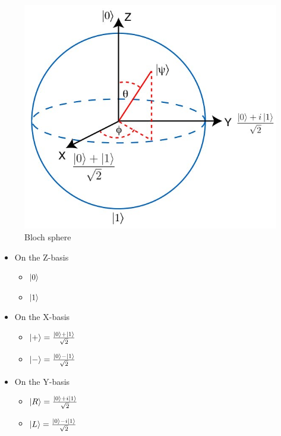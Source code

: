 \begin{figure} [h]
    \centering
    \includegraphics[width=\textwidth]{img/bloch.jpg}
        \caption{Bloch sphere \autocite{imgbloch}}
        \label{fig:bloch sphere}
\end{figure}

\begin{itemize}
    \item On the Z-basis
        \begin{itemize}
            \item $\ket{0}$
            \item $\ket{1}$
        \end{itemize}
    \item On the X-basis
        \begin{itemize}
            \item $\ket{+} = \frac{\ket{0} + \ket{1}}{\sqrt{2}}$
            \item $\ket{-} = \frac{\ket{0} - \ket{1}}{\sqrt{2}}$
        \end{itemize}
    \item On the Y-basis
        \begin{itemize}
            \item $\ket{R} = \frac{\ket{0} + i \ket{1}}{\sqrt{2}}$
            \item $\ket{L} = \frac{\ket{0} - i \ket{1}}{\sqrt{2}}$
        \end{itemize}
\end{itemize}

